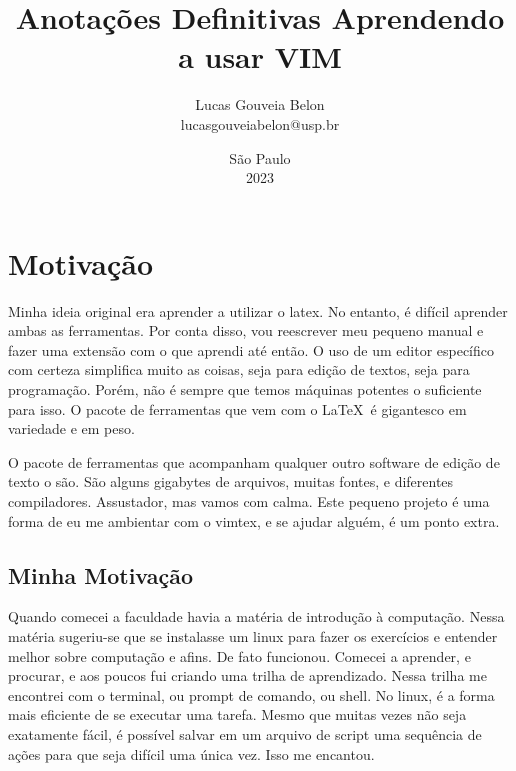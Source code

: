 \documentclass[a4paper, 12pt]{article}
\begin{document}
\title{                                 %
    \textbf{                            %
    Anotações Definitivas               %
    }                                   %
    \break                              %
    Aprendendo a usar VIM               %
}                                       %
\author{                                %
    Lucas Gouveia Belon                 %
    \\                                  %
    lucasgouveiabelon@usp.br            %
}                                       %
\date{\vspace{2.2cm}São Paulo\\2023}    %
\maketitle                              %
\newpage                                %

\tableofcontents                        %
\newpage                                %


\section{Motivação}
Minha ideia original era aprender a utilizar o latex.
No entanto, é difícil aprender ambas as ferramentas.
Por conta disso, vou reescrever meu pequeno manual e fazer uma extensão com o que aprendi até então.
O uso de um editor específico com certeza simplifica muito as coisas, seja para edição de textos, seja para programação.
Porém, não é sempre que temos máquinas potentes o suficiente para isso.
O pacote de ferramentas que vem com o \LaTeX\ é gigantesco em variedade e em peso.

O pacote de ferramentas que acompanham qualquer outro software de edição de texto o são.
São alguns gigabytes de arquivos, muitas fontes, e diferentes compiladores.
Assustador, mas vamos com calma.
Este pequeno projeto é uma forma de eu me ambientar com o vimtex, e se ajudar alguém, é um ponto extra.

\subsection{Minha Motivação}
Quando comecei a faculdade havia a matéria de introdução à computação.
Nessa matéria sugeriu-se que se instalasse um linux para fazer os exercícios e entender melhor sobre computação e afins.
De fato funcionou.
Comecei a aprender, e procurar, e aos poucos fui criando uma trilha de aprendizado.
Nessa trilha me encontrei com o terminal, ou prompt de comando, ou shell.
No linux, é a forma mais eficiente de se executar uma tarefa.
Mesmo que muitas vezes não seja exatamente fácil, é possível salvar em um arquivo de script uma sequência de ações para que seja difícil uma única vez.
Isso me encantou.
\end{document}
